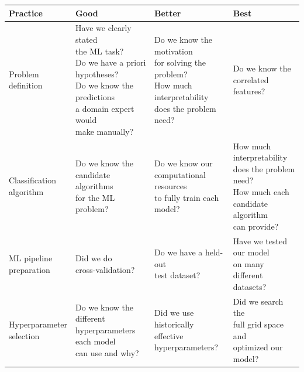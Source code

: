 \documentclass[11pt,]{article}
\begin{document}
\begin{tabular}{|l|l|l|l|}
\hline

\rowcolor{lightgray}
\textbf{Practice} & \textbf{Good} & \textbf{Better} & \textbf{Best} \\ \hline

\makecell[l]{Problem \\ definition} & \makecell[l]{Have we clearly stated \\ the ML task? \\ Do we have a priori hypotheses? \\Do we know the predictions \\ a domain expert would \\ make manually?} & \makecell[l]{Do we know the motivation \\ for solving the problem? \\ How much interpretability \\ does the problem need? } & \makecell[l]{Do we know the correlated \\ features? } \\ \hline

\makecell[l]{Classification \\ algorithm} & \makecell[l]{Do we know the \\ candidate algorithms \\ for the ML problem? \\} & \makecell[l]{Do we know our \\ computational resources \\ to fully train each model?} & \makecell[l]{How much interpretability \\ does the problem need? \\ How much each \\ candidate algorithm \\ can provide?} \\ \hline

\makecell[l]{ML pipeline \\ preparation} & \makecell[l]{Did we do \\ cross-validation?} & \makecell[l]{Do we have a held-out \\ test dataset?} & \makecell[l]{Have we tested our model \\ on many different \\  datasets?} \\ \hline

\makecell[l]{Hyperparameter \\ selection} & \makecell[l]{Do we know the different \\ hyperparameters each model \\ can use and why?} & \makecell[l]{Did we use historically \\ effective hyperparameters? } & \makecell[l]{Did we search the \\ full grid space and \\optimized our model? } \\ \hline


\end{tabular}
\end{document}
